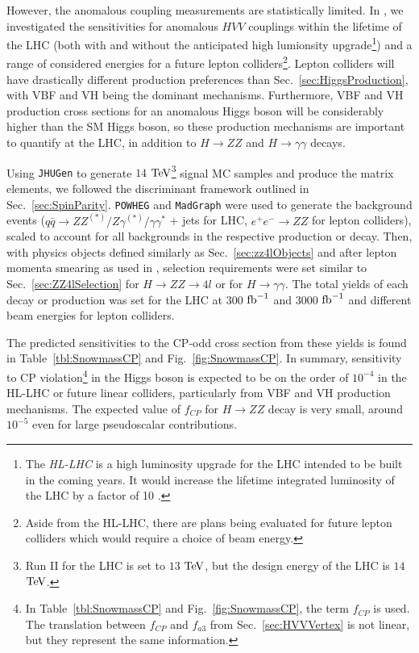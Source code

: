 However, the anomalous coupling measurements are statistically limited. In \cite{Anderson:2013afp}, we investigated the sensitivities for anomalous $HVV$ couplings within the lifetime of the LHC (both with and without the anticipated high lumionsity upgrade\footnote{The \textit{HL-LHC} is a high luminosity upgrade for the LHC intended to be built in the coming years. It would increase the lifetime integrated luminosity of the LHC by a factor of 10 \cite{ATLAS:2013hta,CMS:2013xfa,Dawson:2013bba}.}) and a range of considered energies for a future lepton colliders\footnote{Aside from the HL-LHC, there are plans being evaluated for future lepton colliders \cite{Behnke:2013xla,Koratzinos:2013ncw} which would require a choice of beam energy.}. Lepton colliders will have drastically different production preferences than Sec.~\ref{sec:HiggsProduction}, with VBF and VH being the dominant mechanisms. Furthermore, VBF and VH production cross sections for an anomalous Higgs boson will be considerably higher than the SM Higgs boson, so these production mechanisms are important to quantify at the LHC, in addition to $H\rightarrow ZZ$ and $H\rightarrow \gamma\gamma$ decays.

Using {\tt JHUGen} to generate $14$ $\rm{TeV}$\footnote{Run II for the LHC is set to $13$ $\rm{TeV}$, but the design energy of the LHC is $14$ $\rm{TeV}$.} signal MC samples and produce the matrix elements, we followed the discriminant framework outlined in Sec.~\ref{sec:SpinParity}. {\tt POWHEG} and {\tt MadGraph} were used to generate the background events ($q\bar{q}\rightarrow ZZ^{(*)}/Z\gamma^{(*)}/\gamma\gamma^{*}$ + jets for LHC, $e^+e^-\rightarrow ZZ$ for lepton colliders), scaled to account for all backgrounds in the respective production or decay. Then, with physics objects defined similarly as Sec.~\ref{sec:zz4lObjects} and after lepton momenta smearing as used in \cite{Gao:2010qx,Bolognesi:2012mm}, selection requirements were set similar to Sec.~\ref{sec:ZZ4lSelection} for $H\rightarrow ZZ\rightarrow 4l$ or \cite{Khachatryan:2014ira} for $H\rightarrow \gamma\gamma$. The total yields of each decay or production was set for the LHC at $300$ $\rm{fb}^{-1}$ and $3000$ $\rm{fb}^{-1}$ and different beam energies for lepton colliders.

The predicted sensitivities to the CP-odd cross section from these yields is found in Table~\ref{tbl:SnowmassCP} and Fig.~\ref{fig:SnowmassCP}. In summary, sensitivity to CP violation\footnote{In Table~\ref{tbl:SnowmassCP} and Fig.~\ref{fig:SnowmassCP}, the term $f_{CP}$ is used. The translation between $f_{CP}$ and $f_{a3}$ from Sec.~\ref{sec:HVVVertex} is not linear, but they represent the same information.} in the Higgs boson is expected to be on the order of $10^{-4}$ in the HL-LHC or future linear colliders, particularly from VBF and VH production mechanisms. The expected value of $f_{CP}$ for $H\rightarrow ZZ$ decay is very small, around $10^{-5}$ even for large pseudoscalar contributions.

